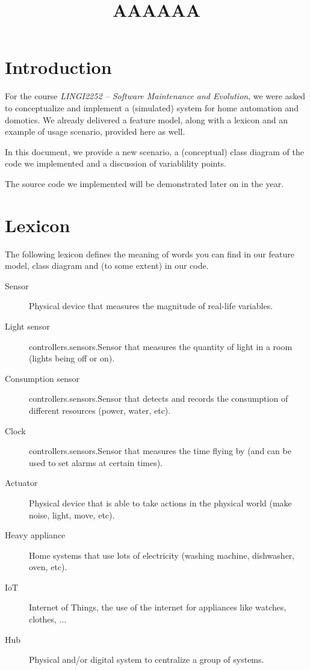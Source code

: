     \title{AAAAAA}
    \newpage
    

	\section{Introduction}
		For the course \textit{LINGI2252 -- Software Maintenance and Evolution}, we were asked to conceptualize and implement a (simulated) system for home automation and domotics.
		We already delivered a feature model, along with a lexicon and an example of usage scenario, provided here as well.
		
		In this document, we provide a new scenario, a (conceptual) class diagram of the code we implemented and a discussion of variablility points.
		
		The source code we implemented will be demonstrated later on in the year.
	
	\section{Lexicon}
		The following lexicon defines the meaning of words you can find in our feature model, class diagram and (to some extent) in our code.
		
		\begin{description}
            \item[Sensor] Physical device that measures the magnitude of real-life variables.
            \item[Light sensor] controllers.sensors.Sensor that measures the quantity of light in a room (lights being off or on).
            \item[Consumption sensor] controllers.sensors.Sensor that detects and records the consumption of different resources (power, water, etc).
            \item[Clock] controllers.sensors.Sensor that measures the time flying by (and can be used to set alarms at certain times).
            \item[Actuator] Physical device that is able to take actions in the physical world (make noise, light, move, etc).
            \item[Heavy appliance] Home systems that use lots of electricity (washing machine, dishwasher, oven, etc).
            \item[IoT] Internet of Things, the use of the internet for appliances like watches, clothes, ...
            \item[Hub] Physical and/or digital system to centralize a group of systems.
        \end{description}
	
